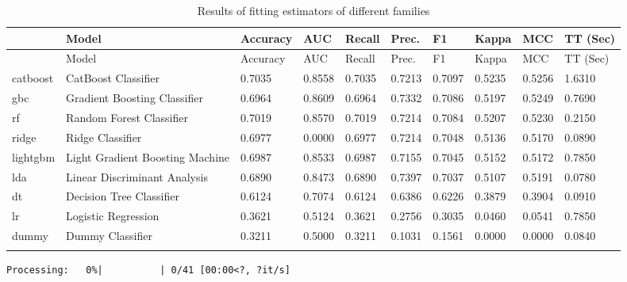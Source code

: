 \documentclass[
  letterpaper,
  DIV=11,
  numbers=noendperiod]{scrartcl}
\begin{document}
\begin{table}
\begin{minipage}[t]{\linewidth}
{\begin{longtable}[]{@{}llllllllll@{}}
\toprule\noalign{}
~ & Model & Accuracy & AUC & Recall & Prec. & F1 & Kappa & MCC & TT
(Sec) \\
\midrule\noalign{}
\endfirsthead
\toprule\noalign{}
~ & Model & Accuracy & AUC & Recall & Prec. & F1 & Kappa & MCC & TT
(Sec) \\
\midrule\noalign{}
\endhead
\bottomrule\noalign{}
\endlastfoot
catboost & CatBoost Classifier & 0.7035 & 0.8558 & 0.7035 & 0.7213 &
0.7097 & 0.5235 & 0.5256 & 1.6310 \\
gbc & Gradient Boosting Classifier & 0.6964 & 0.8609 & 0.6964 & 0.7332 &
0.7086 & 0.5197 & 0.5249 & 0.7690 \\
rf & Random Forest Classifier & 0.7019 & 0.8570 & 0.7019 & 0.7214 &
0.7084 & 0.5207 & 0.5230 & 0.2150 \\
ridge & Ridge Classifier & 0.6977 & 0.0000 & 0.6977 & 0.7214 & 0.7048 &
0.5136 & 0.5170 & 0.0890 \\
lightgbm & Light Gradient Boosting Machine & 0.6987 & 0.8533 & 0.6987 &
0.7155 & 0.7045 & 0.5152 & 0.5172 & 0.7850 \\
lda & Linear Discriminant Analysis & 0.6890 & 0.8473 & 0.6890 & 0.7397 &
0.7037 & 0.5107 & 0.5191 & 0.0780 \\
dt & Decision Tree Classifier & 0.6124 & 0.7074 & 0.6124 & 0.6386 &
0.6226 & 0.3879 & 0.3904 & 0.0910 \\
lr & Logistic Regression & 0.3621 & 0.5124 & 0.3621 & 0.2756 & 0.3035 &
0.0460 & 0.0541 & 0.7850 \\
dummy & Dummy Classifier & 0.3211 & 0.5000 & 0.3211 & 0.1031 & 0.1561 &
0.0000 & 0.0000 & 0.0840 \\
\caption{}\label{T_60247}\tabularnewline
\end{longtable}

}

\end{minipage}%
\newline
\begin{minipage}[t]{\linewidth}

{\centering 

\begin{verbatim}
Processing:   0%|          | 0/41 [00:00<?, ?it/s]
\end{verbatim}

}

\end{minipage}%

\caption{Results of fitting estimators of different families}

\end{table}
\end{document}
